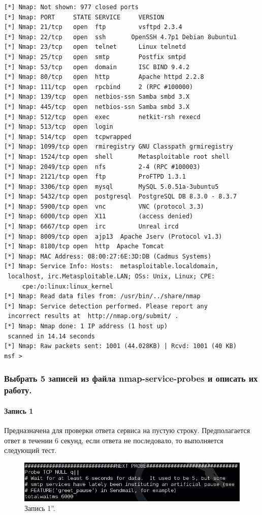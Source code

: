 \documentclass[a4paper, 14pt]{article}				%
\begin{document}
\begin{Verbatim}[frame=single]
[*] Nmap: Not shown: 977 closed ports
[*] Nmap: PORT     STATE SERVICE     VERSION
[*] Nmap: 21/tcp   open  ftp         vsftpd 2.3.4
[*] Nmap: 22/tcp   open  ssh       OpenSSH 4.7p1 Debian 8ubuntu1
[*] Nmap: 23/tcp   open  telnet      Linux telnetd
[*] Nmap: 25/tcp   open  smtp        Postfix smtpd
[*] Nmap: 53/tcp   open  domain      ISC BIND 9.4.2
[*] Nmap: 80/tcp   open  http        Apache httpd 2.2.8
[*] Nmap: 111/tcp  open  rpcbind     2 (RPC #100000)
[*] Nmap: 139/tcp  open  netbios-ssn Samba smbd 3.X
[*] Nmap: 445/tcp  open  netbios-ssn Samba smbd 3.X
[*] Nmap: 512/tcp  open  exec        netkit-rsh rexecd
[*] Nmap: 513/tcp  open  login
[*] Nmap: 514/tcp  open  tcpwrapped
[*] Nmap: 1099/tcp open  rmiregistry GNU Classpath grmiregistry
[*] Nmap: 1524/tcp open  shell       Metasploitable root shell
[*] Nmap: 2049/tcp open  nfs         2-4 (RPC #100003)
[*] Nmap: 2121/tcp open  ftp         ProFTPD 1.3.1
[*] Nmap: 3306/tcp open  mysql       MySQL 5.0.51a-3ubuntu5
[*] Nmap: 5432/tcp open  postgresql  PostgreSQL DB 8.3.0 - 8.3.7
[*] Nmap: 5900/tcp open  vnc         VNC (protocol 3.3)
[*] Nmap: 6000/tcp open  X11         (access denied)
[*] Nmap: 6667/tcp open  irc         Unreal ircd
[*] Nmap: 8009/tcp open  ajp13  Apache Jserv (Protocol v1.3)
[*] Nmap: 8180/tcp open  http  Apache Tomcat
[*] Nmap: MAC Address: 08:00:27:6E:3D:DB (Cadmus Systems)
[*] Nmap: Service Info: Hosts:  metasploitable.localdomain,
 localhost, irc.Metasploitable.LAN; OSs: Unix, Linux; CPE: 
     cpe:/o:linux:linux_kernel
[*] Nmap: Read data files from: /usr/bin/../share/nmap
[*] Nmap: Service detection performed. Please report any
 incorrect results at  http://nmap.org/submit/ .
[*] Nmap: Nmap done: 1 IP address (1 host up)
 scanned in 14.14 seconds
[*] Nmap: Raw packets sent: 1001 (44.028KB) | Rcvd: 1001 (40 KB)
msf > 
\end{Verbatim}


\subsubsection{Выбрать 5 записей из файла nmap-service-probes и описать их работу.}

\paragraph{Запись 1\\}
Предназначена для проверки ответа сервиса на пустую строку. Предполагается ответ в течении 6 секунд, если ответа не последовало, то выполняется следующий тест.
\begin{figure}[h!]
\centering
\includegraphics[width=\textwidth]{rsrc/nmap_entry1}
\caption{Запись 1''.}
\end{figure}
\end{document}
